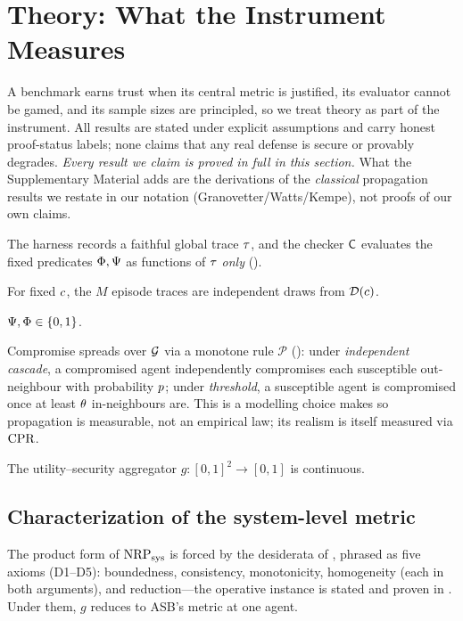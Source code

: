 \section{Theory: What the Instrument Measures}
\label{sec:theory}

A benchmark earns trust when its central metric is justified, its evaluator cannot be
gamed, and its sample sizes are principled, so we treat theory as part of the instrument.
All results are stated under explicit assumptions and carry honest proof-status labels;
none claims that any real defense is secure or provably degrades. \emph{Every result we
claim is proved in full in this section.} What the Supplementary Material adds are the
derivations of the \emph{classical} propagation results we restate in our notation
(Granovetter/Watts/Kempe), not proofs of our own claims.

\begin{assumption}
\label{as:tcb}
The harness records a faithful global trace $\tau$, and the checker $\mathsf{C}$
evaluates the fixed predicates $\Phi,\Psi$ as functions of $\tau$ \emph{only}
().
\end{assumption}
\begin{assumption}[i.i.d.\ episodes]
\label{as:iid}
For fixed $c$, the $M$ episode traces are independent draws from
$\mathcal{D}(c)$.
\end{assumption}
\begin{assumption}
\label{as:bounded}
$\Psi,\Phi\in\{0,1\}$.
\end{assumption}
\begin{assumption}
\label{as:prop}
Compromise spreads over $\mathcal{G}$ via a monotone rule $\mathcal{P}$ ():
under \emph{independent cascade}, a compromised agent independently compromises each
susceptible out-neighbour with probability $p$; under \emph{threshold}, a susceptible
agent is compromised once at least $\theta$ in-neighbours are. This is a modelling choice
 makes so propagation is measurable, not an empirical law; its realism is itself
measured via $\mathrm{CPR}$.
\end{assumption}
\begin{assumption}
\label{as:cont}
The utility--security aggregator $g:[0,1]^2\to[0,1]$ is continuous.
\end{assumption}

\subsection{Characterization of the system-level metric}
\label{sec:theory-metric}
The product form of $\mathrm{NRP}_{\mathrm{sys}}$ is forced by the desiderata of , phrased as
five axioms (D1--D5): boundedness, consistency, monotonicity, homogeneity (each in both
arguments), and reduction---the operative instance is stated and proven in .
Under them, $g$ reduces to ASB's metric at one agent.

